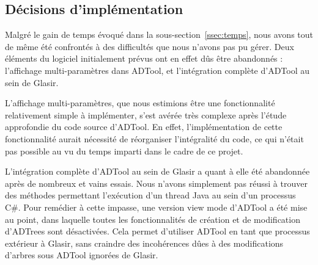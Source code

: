 \subsection{Décisions d'implémentation}
\label{sec:decisions}

Malgré le gain de temps évoqué dans la {\sc sous-section}~\ref{ssec:temps}, nous avons tout de même été confrontés à des difficultés que nous n'avons pas pu gérer. Deux éléments du logiciel initialement prévus ont en effet dûs être abandonnés : l'affichage multi-paramètres dans ADTool, et l'intégration complète d'ADTool au sein de Glasir.

L'affichage multi-paramètres, que nous estimions être une fonctionnalité relativement simple à implémenter, s'est avérée très complexe après l'étude approfondie du code source d'ADTool. En effet, l'implémentation de cette fonctionnalité aurait nécessité de réorganiser l'intégralité du code, ce qui n'était pas possible au vu du temps imparti dans le cadre de ce projet. 

L'intégration complète d'ADTool au sein de Glasir a quant à elle été abandonnée après de nombreux et vains essais. Nous n'avons simplement pas réussi à trouver des méthodes permettant l'exécution d'un thread Java au sein d'un processus C\#. Pour remédier à cette impasse, une version \og view mode \fg d'ADTool a été mise au point, dans laquelle toutes les fonctionnalités de création et de modification d'ADTrees sont désactivées. Cela permet d'utiliser ADTool en tant que processus extérieur à Glasir, sans craindre des incohérences dûes à des modifications d'arbres sous ADTool ignorées de Glasir.  

